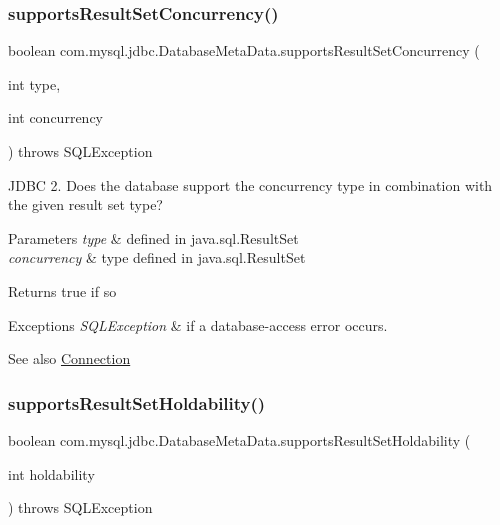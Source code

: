 \subsubsection{\texorpdfstring{supports\+Result\+Set\+Concurrency()}{supportsResultSetConcurrency()}}
{\footnotesize\ttfamily boolean com.\+mysql.\+jdbc.\+Database\+Meta\+Data.\+supports\+Result\+Set\+Concurrency (\begin{DoxyParamCaption}\item[{int}]{type,  }\item[{int}]{concurrency }\end{DoxyParamCaption}) throws S\+Q\+L\+Exception}

J\+D\+BC 2. Does the database support the concurrency type in combination with the given result set type?


\begin{DoxyParams}{Parameters}
{\em type} & defined in java.\+sql.\+Result\+Set \\
\hline
{\em concurrency} & type defined in java.\+sql.\+Result\+Set \\
\hline
\end{DoxyParams}
\begin{DoxyReturn}{Returns}
true if so 
\end{DoxyReturn}

\begin{DoxyExceptions}{Exceptions}
{\em S\+Q\+L\+Exception} & if a database-\/access error occurs. \\
\hline
\end{DoxyExceptions}
\begin{DoxySeeAlso}{See also}
\mbox{\hyperlink{interfacecom_1_1mysql_1_1jdbc_1_1_connection}{Connection}} 
\end{DoxySeeAlso}
\mbox{\label{classcom_1_1mysql_1_1jdbc_1_1_database_meta_data_a75ad03ea2835ac88e0a16dd0fa81cf0d}} 
\subsubsection{\texorpdfstring{supports\+Result\+Set\+Holdability()}{supportsResultSetHoldability()}}
{\footnotesize\ttfamily boolean com.\+mysql.\+jdbc.\+Database\+Meta\+Data.\+supports\+Result\+Set\+Holdability (\begin{DoxyParamCaption}\item[{int}]{holdability }\end{DoxyParamCaption}) throws S\+Q\+L\+Exception}

